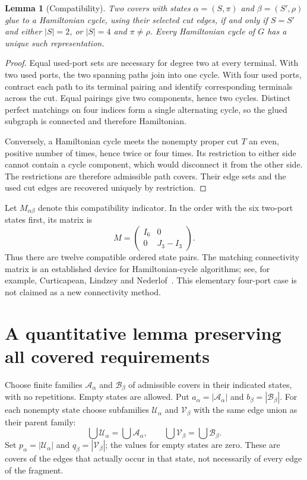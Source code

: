 \documentclass[10pt]{article}
\newtheorem{lemma}[theorem]{Lemma}
\begin{document}
\begin{lemma}[Compatibility]\label{lem:compatibility}
Two covers with states $\alpha=(S,\pi)$ and $\beta=(S',\rho)$ glue to a
Hamiltonian cycle, using their selected cut edges, if and only if $S=S'$ and
either $|S|=2$, or $|S|=4$ and $\pi\ne\rho$.
Every Hamiltonian cycle of $G$ has a unique such representation.
\end{lemma}
\begin{proof}
Equal used-port sets are necessary for degree two at every terminal. With
two used ports, the two spanning paths join into one cycle. With four used
ports, contract each path to its terminal pairing and identify corresponding
terminals across the cut. Equal pairings give two components, hence two
cycles. Distinct perfect matchings on four indices form a single alternating
cycle, so the glued subgraph is connected and therefore Hamiltonian.

Conversely, a Hamiltonian cycle meets the nonempty proper cut $T$ an even,
positive number of times, hence twice or four times. Its restriction to
either side cannot contain a cycle component, which would disconnect it
from the other side. The restrictions are therefore admissible path covers.
Their edge sets and the used cut edges are recovered uniquely by restriction.
\end{proof}

Let $M_{\alpha\beta}$ denote this compatibility indicator. In the order with
the six two-port states first, its matrix is
\[
 M=\begin{pmatrix}I_6&0\\0&J_3-I_3\end{pmatrix}.
\]
Thus there are twelve compatible ordered state pairs. The matching
connectivity matrix is an established device for Hamiltonian-cycle
algorithms; see, for example, Curticapean, Lindzey and Nederlof~\cite{cln}.
This elementary four-port case is not claimed as a new connectivity method.

\section{A quantitative lemma preserving all covered requirements}
Choose finite families $\mathcal A_\alpha$ and $\mathcal B_\beta$ of admissible
covers in their indicated states, with no repetitions. Empty states are
allowed. Put $a_\alpha=|\mathcal A_\alpha|$ and $b_\beta=|\mathcal B_\beta|$.
For each nonempty state choose subfamilies $\mathcal U_\alpha$ and
$\mathcal V_\beta$ with the same edge union as their parent family:
\[
 \bigcup\mathcal U_\alpha=\bigcup\mathcal A_\alpha,\qquad
 \bigcup\mathcal V_\beta=\bigcup\mathcal B_\beta.
\]
Set $p_\alpha=|\mathcal U_\alpha|$ and $q_\beta=|\mathcal V_\beta|$;
the values for empty states are zero. These are covers of the edges that
actually occur in that state, not necessarily of every edge of the fragment.
\end{document}
